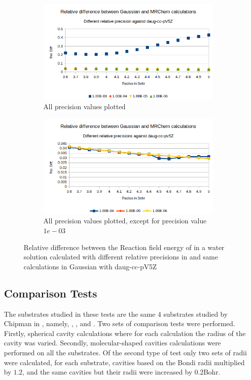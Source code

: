 \documentclass[../master_thesis.tex]{subfiles}
\begin{document}
\begin{figure}[!htb]
  \centering
  \begin{subfigure}[b]{0.75\linewidth}
    \includegraphics[width=\linewidth]{img/lipprecallreldiff.png}
    \caption{All precision values plotted}
  \end{subfigure}
  \begin{subfigure}[b]{0.75\linewidth}
    \includegraphics[width=\linewidth]{img/lipprecallreldiffexcl.png}
    \caption{All precision values plotted, except for precision value $1e-03$}
  \end{subfigure}
  \caption[Relative difference of  with different precision values against Gaussian results]{Relative difference between the Reaction field energy of  in a water solution calculated with different relative precisions in \mrchem  and same calculations in Gaussian with daug-cc-pV5Z}
  \label{fig:lipprecreldef}
\end{figure}
\clearpage

\subsection{Comparison Tests}
The substrates studied in these tests are the same 4 substrates studied by Chipman in \cite{Chipman2002},
namely, , ,  and . Two sets of comparison tests
were performed. Firstly, spherical cavity calculations where for each calculation the radius of the
cavity was varied. Secondly, molecular-shaped cavities calculations were performed on
all the substrates. Of the second type of test only two sets of radii were calculated, for
each substrate, cavities based on the Bondi radii multiplied by $1.2$, and the same cavities
but their radii were increased by $0.2$Bohr.
\end{document}
